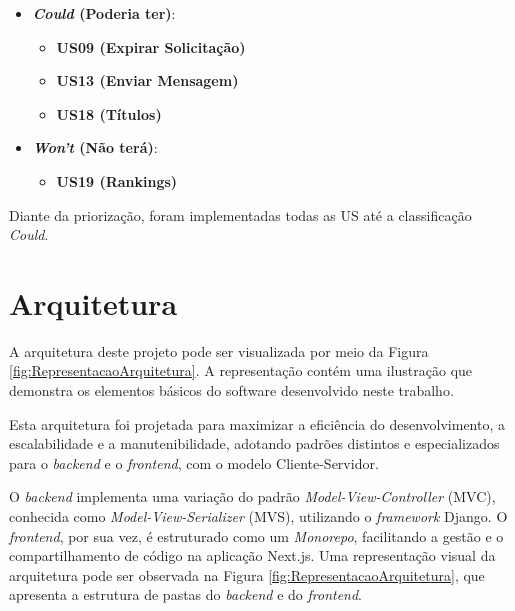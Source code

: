 \begin{itemize}

\item \textbf{\textit{Could} (Poderia ter)}:

\begin{itemize}

\item \textbf{US09 (Expirar Solicitação)}

\item \textbf{US13 (Enviar Mensagem)}

\item \textbf{US18 (Títulos)}

\end{itemize}

\end{itemize}

\begin{itemize}

\item \textbf{\textit{Won't} (Não terá)}:

\begin{itemize}

\item \textbf{US19 (Rankings)}

\end{itemize}

\end{itemize}

Diante da priorização, foram implementadas todas as US até a classificação \textit{Could}.


\section [Arquitetura] {Arquitetura}
\label{arquitetura}

A arquitetura deste projeto pode ser visualizada por meio da Figura \ref{fig:RepresentacaoArquitetura}. A representação contém uma ilustração que demonstra os elementos básicos do software desenvolvido neste trabalho.

Esta arquitetura foi projetada para maximizar a eficiência do desenvolvimento, a escalabilidade e a manutenibilidade, adotando padrões distintos e especializados para o \textit{backend} e o \textit{frontend}, com o modelo Cliente-Servidor. 

O \textit{backend} implementa uma variação do padrão \textit{Model-View-Controller} (MVC), conhecida como \textit{Model-View-Serializer} (MVS), utilizando o \textit{framework} Django. O \textit{frontend}, por sua vez, é estruturado como um \textit{Monorepo}, facilitando a gestão e o compartilhamento de código na aplicação Next.js. Uma representação visual da arquitetura pode ser observada na Figura \ref{fig:RepresentacaoArquitetura}, que apresenta a estrutura de pastas do \textit{backend} e do \textit{frontend}.

